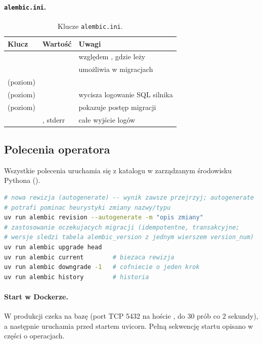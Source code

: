 \paragraph{\texttt{alembic.ini}.}
\begin{table}[H]
\centering\small
\renewcommand{\arraystretch}{1.2}
\begin{tabularx}{\textwidth}{@{}llY@{}}
\toprule
\textbf{Klucz} & \textbf{Wartość} & \textbf{Uwagi} \\
\midrule
{} &  & względem , gdzie leży  \\
 &  & umożliwia  w migracjach \\
 (poziom) &  & \\
 (poziom) &  & wycisza logowanie SQL silnika \\
 (poziom) &  & pokazuje postęp migracji \\
 & , stderr & całe wyjście logów \\
\bottomrule
\end{tabularx}
\caption{Klucze \texttt{alembic.ini}.}
\end{table}

\subsection{Polecenia operatora}

Wszystkie polecenia uruchamia się z katalogu  w zarządzanym środowisku
Pythona ().

\begin{lstlisting}[language=bash]
# nowa rewizja (autogenerate) -- wynik zawsze przejrzyj; autogenerate
# potrafi pominac heurystyki zmiany nazwy/typu
uv run alembic revision --autogenerate -m "opis zmiany"
# zastosowanie oczekujacych migracji (idempotentne, transakcyjne;
# wersje sledzi tabela alembic_version z jednym wierszem version_num)
uv run alembic upgrade head
uv run alembic current        # biezaca rewizja
uv run alembic downgrade -1   # cofniecie o jeden krok
uv run alembic history        # historia
\end{lstlisting}

\paragraph{Start w Dockerze.} W produkcji  czeka na bazę (port TCP
5432 na hoście , do 30 prób co 2 sekundy), a następnie uruchamia
 przed startem uvicorn. Pełną sekwencję startu opisano w
części o operacjach.

